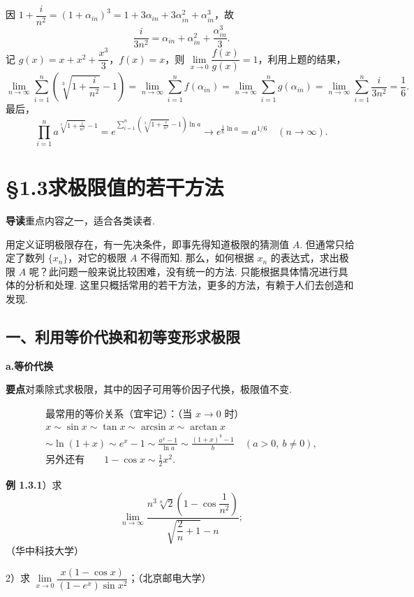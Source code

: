 \documentclass[UTF8,12pt,a4paper,fontset=fandol]{ctexart}
\begin{document}
因 $1+\dfrac{i}{n^2}=(1+\alpha_{in})^3=1+3\alpha_{in}+3\alpha_{in}^2+\alpha_{in}^3$，故
\[
  \frac{i}{3n^2}=\alpha_{in}+\alpha_{in}^2+\frac{\alpha_{in}^3}{3}.
\]
记 $g(x)=x+x^2+\dfrac{x^3}{3}$，$f(x)=x$，则 $\lim\limits_{x\to0}\dfrac{f(x)}{g(x)}=1$，利用上题的结果，
\[
\lim_{n\to\infty}\sum_{i=1}^n\left(\sqrt[3]{1+\frac{i}{n^2}}-1\right)
=\lim_{n\to\infty}\sum_{i=1}^n f(\alpha_{in})
=\lim_{n\to\infty}\sum_{i=1}^n g(\alpha_{in})
=\lim_{n\to\infty}\sum_{i=1}^n\frac{i}{3n^2}
=\frac16.
\]
最后，
\[
\prod_{i=1}^n a^{\sqrt[3]{1+\frac{i}{n^2}}-1}
=e^{\sum_{i=1}^n\left(\sqrt[3]{1+\frac{i}{n^2}}-1\right)\ln a}
\to e^{\frac16\ln a}=a^{1/6}\quad(n\to\infty).
\]

\section*{§1.3\quad 求极限值的若干方法}

\noindent\textbf{导读}\quad 重点内容之一，适合各类读者.

用定义证明极限存在，有一先决条件，即事先得知道极限的猜测值 $A$. 但通常只给定了数列 $\{x_n\}$，对它的极限 $A$ 不得而知. 那么，如何根据 $x_n$ 的表达式，求出极限 $A$ 呢？此问题一般来说比较困难，没有统一的方法. 只能根据具体情况进行具体的分析和处理. 这里只概括常用的若干方法，更多的方法，有赖于人们去创造和发现.

\subsection*{一、利用等价代换和初等变形求极限}

\noindent\textbf{a.\quad 等价代换}

\noindent\textbf{要点}\quad 对乘除式求极限，其中的因子可用等价因子代换，极限值不变.

\[
\boxed{
\begin{gathered}
\text{最常用的等价关系（宜牢记）：（当 }x\to0\text{ 时）}\\
x\sim\sin x\sim\tan x\sim\arcsin x\sim\arctan x\\
\sim\ln(1+x)\sim e^x-1\sim\frac{a^x-1}{\ln a}\sim\frac{(1+x)^b-1}{b}\quad(a>0,\ b\ne0),\\
\text{另外还有}\qquad 1-\cos x\sim\frac12x^2.
\end{gathered}}
\]

\noindent\textbf{例 1.3.1}）求
\[
  \lim_{n\to\infty}
  \frac{n^3\sqrt[n]{2}\left(1-\cos\dfrac1{n^2}\right)}
  {\sqrt{\dfrac{2}{n}+1}-n};
\]
（华中科技大学）

2）求 $\lim\limits_{x\to0}\dfrac{x(1-\cos x)}{(1-e^x)\sin x^2}$；（北京邮电大学）
\end{document}
